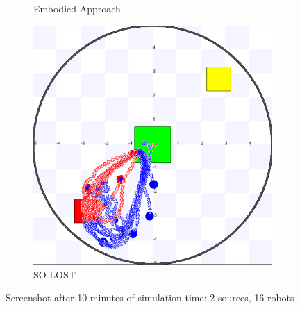 \documentclass[letterpaper, 10 pt, conference]{ieeeconf}  %
\begin{document}
\begin{figure}[H]
\begin{subfigure}{.25\textwidth}
          \centering
          \caption{Embodied Approach}
     \end{subfigure}
    \centering
     \begin{subfigure}{.25\textwidth}
       \includegraphics[width=0.9\linewidth]{images/so-lost/2/raw/16.png}
          \centering
          \caption{SO-LOST}
     \end{subfigure}
   
   \centering
   \caption{Screenshot after 10 minutes of simulation time: 2 sources, 16 robots}
   \label{fig:screenshot_2_source}
\end{figure}
\end{document}
